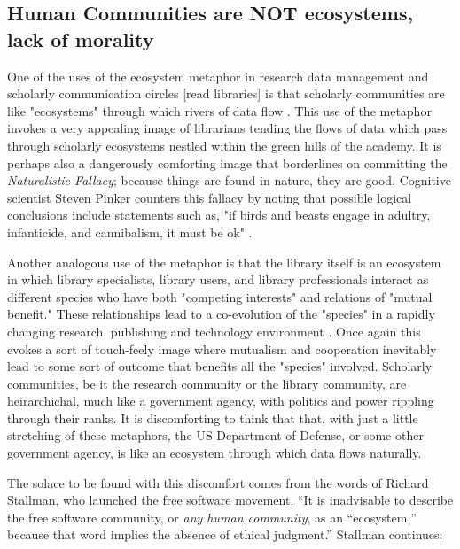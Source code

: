 \subsection{Human Communities are NOT ecosystems, lack of morality}

One of the uses of the ecosystem metaphor in research data management and scholarly communication circles [read libraries] is that scholarly communities are like "ecosystems" through which rivers of data flow \citep{choudhury_2010}. This use of the metaphor invokes a very appealing image of librarians tending the flows of data which pass through scholarly ecosystems nestled within the green hills of the academy. It is perhaps also a dangerously comforting image that borderlines on committing the \textit{Naturalistic Fallacy}; because things are found in nature, they are good. Cognitive scientist Steven Pinker counters this fallacy by noting that possible logical conclusions include statements such as, "if birds and beasts engage in adultry, infanticide, and cannibalism, it must be ok" \citep{pinker_2002}. 

Another analogous use of the metaphor is that the library itself is an ecosystem in which library specialists, library users, and library professionals interact as different species who have both "competing interests" and relations of "mutual benefit." These relationships lead to a co-evolution of the "species" in a rapidly changing research, publishing and technology environment \citep{walter_2008}. Once again this evokes a sort of touch-feely image where mutualism and cooperation inevitably lead to some sort of outcome that benefits all the "species" involved. Scholarly communities, be it the research community or the library community, are heirarchichal, much like a government agency, with politics and power rippling through their ranks. It is discomforting to think that that, with just a little stretching of these metaphors, the US Department of Defense, or some other government agency, is like an ecosystem through which data flows naturally. 

The solace to be found with this discomfort comes from the words of Richard Stallman, who launched the free software movement. “It is inadvisable to describe the free software community, or \textit{any human community}, as an “ecosystem,” because that word implies the absence of ethical judgment.”  Stallman continues:
 
